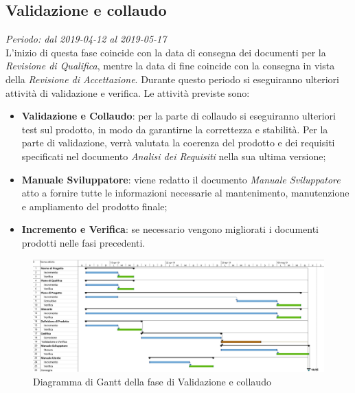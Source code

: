 \subsection{Validazione e collaudo}
\textit{Periodo: dal 2019-04-12 al 2019-05-17 } \\
L'inizio di questa fase coincide con la data di consegna dei documenti per la 
\textit{Revisione di Qualifica}, mentre la data di fine coincide con la 
consegna in vista della \textit{Revisione di Accettazione}. Durante questo periodo 
si eseguiranno ulteriori attività di validazione e verifica. Le attività 
previste sono: 
\begin{itemize}
	\item \textbf{Validazione e Collaudo}: per la parte di collaudo si 
	eseguiranno ulteriori test sul prodotto, in modo da garantirne la 
	correttezza e stabilità. Per la parte di validazione, verrà 
	valutata la coerenza del prodotto e dei requisiti specificati nel documento 
	\textit{Analisi dei Requisiti} nella sua ultima versione;
	\item \textbf{Manuale Sviluppatore}: viene redatto il documento \textit{Manuale Sviluppatore} atto a fornire tutte le informazioni necessarie al mantenimento, manutenzione e ampliamento del prodotto finale;
	\item \textbf{Incremento e Verifica}: se necessario vengono migliorati i 
	documenti prodotti nelle fasi precedenti.
\end{itemize}
\begin{figure}[H]
	\includegraphics[width=0.99\linewidth]{res/images/gantt_val.jpg}
	\caption{Diagramma di Gantt della fase di Validazione e collaudo}
\end{figure}